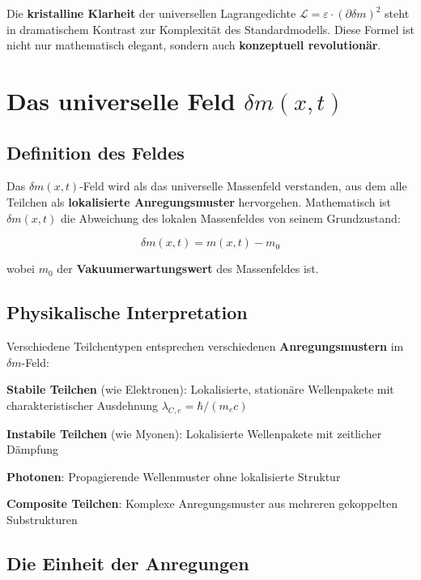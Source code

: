 \documentclass[12pt,a4paper]{report}
\begin{document}
	Die \textbf{kristalline Klarheit} der universellen Lagrangedichte $\mathcal{L} = \varepsilon \cdot (\partial\delta m)^2$ steht in dramatischem Kontrast zur Komplexität des Standardmodells. Diese Formel ist nicht nur mathematisch elegant, sondern auch \textbf{konzeptuell revolutionär}.
	
	\section{Das universelle Feld $\delta m(x,t)$}
	
	\subsection{Definition des Feldes}
	
	Das $\delta m(x,t)$-Feld wird als das universelle Massenfeld verstanden, aus dem alle Teilchen als \textbf{lokalisierte Anregungsmuster} hervorgehen. Mathematisch ist $\delta m(x,t)$ die Abweichung des lokalen Massenfeldes von seinem Grundzustand:
	
	\begin{equation}
		\delta m(x,t) = m(x,t) - m_0
	\end{equation}
	
	wobei $m_0$ der \textbf{Vakuumerwartungswert} des Massenfeldes ist.
	
	\subsection{Physikalische Interpretation}
	
	Verschiedene Teilchentypen entsprechen verschiedenen \textbf{Anregungsmustern} im $\delta m$-Feld:
	
	\textbf{Stabile Teilchen} (wie Elektronen): Lokalisierte, stationäre Wellenpakete mit charakteristischer Ausdehnung $\lambda_{C,e} = \hbar/(m_e c)$
	
	\textbf{Instabile Teilchen} (wie Myonen): Lokalisierte Wellenpakete mit zeitlicher Dämpfung
	
	\textbf{Photonen}: Propagierende Wellenmuster ohne lokalisierte Struktur
	
	\textbf{Composite Teilchen}: Komplexe Anregungsmuster aus mehreren gekoppelten Substrukturen
	
	\subsection{Die Einheit der Anregungen}
	
\end{document}
